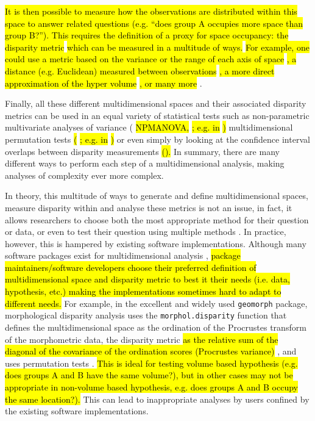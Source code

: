 \documentclass[12pt,letterpaper]{article}
\begin{document}
\hl{It is then possible to measure how the observations are distributed within this space to answer related questions (e.g. ``does group A occupies more space than group B?'').
This requires the definition of a proxy for space occupancy: the disparity metric}
\citep[or index;][]{Hopkins2017}
\hl{which can be measured in a multitude of ways.}
\hl{For example, one could use a metric based on the variance or the range of each axis of space}
\citep{Wills2001, Ciampaglio2001}
\hl{, a distance (e.g. Euclidean) measured between observations}
\citep{foote1993contributions,Foote29111996}
\hl{, a more direct approximation of the hyper volume }
\citep{cornwell2006trait,DonohueDim}
\hl{, or many more }
\citep[e.g.][]{navarro2003MDA}.

Finally, all these different multidimensional spaces and their associated disparity metrics can be used in an equal variety of statistical tests such as non-parametric multivariate analyses of variance (
\hl{NPMANOVA, }
\citealt{NPMANOVA}
\hl{; e.g. in }
\citealt{Brusatte12092008}
\hl{)}
multidimensional permutation tests
\hl{(}
\citealt{ManlyPermutations}
\hl{; e.g. in }
\citealt{diaz2016global}
\hl{)}
or even simply by looking at the confidence interval overlaps between disparity measurements
\hl{().}
In summary, there are many different ways to perform each step of a multidimensional analysis, making analyses of complexity ever more complex.

In theory, this multitude of ways to generate and define multidimensional spaces, measure disparity within and analyse these metrics is not an issue, in fact, it allows researchers to choose both the most appropriate method for their question or data, or even to test their question using multiple methods \citep[such as][for biogeography]{matzke2013biogeobears}.
In practice, however, this is hampered by existing software implementations.
Although many software packages exist for multidimensional analysis \citep[e.g.][]{navarro2003MDA,bouxin2005ginkgo,de2007ginkgo,oksanen2007vegan,adams2013geomorph,Claddis,adams2017geometric},
\hl{package maintainers/software developers choose their preferred definition of multidimensional space and disparity metric to best it their needs (i.e. data, hypothesis, etc.) making the implementations sometimes hard to adapt to different needs.}
For example, in the excellent and widely used \texttt{geomorph} package, morphological disparity analysis uses the \texttt{morphol.disparity} function that defines the multidimensional space as the ordination of the Procrustes transform of the morphometric data, the disparity metric
\hl{as the relative sum of the diagonal of the covariance of the ordination scores (Procrustes variance)}
, and uses permutation tests \citep{zelditch2012geometric,adams2013geomorph,adams2017geometric}.
\hl{This is ideal for testing volume based hypothesis (e.g. does groups A and B have the same volume?), but in other cases may not be appropriate in non-volume based hypothesis, e.g. does groups A and B occupy the same location?).}
This can lead to inappropriate analyses by users confined by the existing software implementations. %
\end{document}
